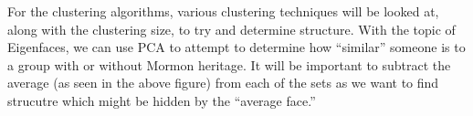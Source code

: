 \documentclass{article}
\begin{document}
For the clustering algorithms, various clustering techniques will be looked at, along with the clustering size, to try and determine structure. With the topic of Eigenfaces, we can use PCA to attempt to determine how ``similar'' someone is to a group with or without Mormon heritage. It will be important to subtract the average (as seen in the above figure) from each of the sets as we want to find strucutre which might be hidden by the ``average face.''
\end{document}
